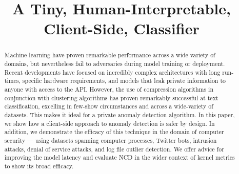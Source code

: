 \documentclass[conference]{IEEEtran}
\begin{document}
\title{A Tiny, Human-Interpretable, Client-Side, Classifier}



\maketitle

\begin{abstract}
  Machine learning have proven remarkable performance across a wide variety of domains, but nevertheless fail to adversaries during model training or deployment. 
  Recent developments have focused on incredibly complex architectures with long run-times, specific hardware requirements, and models that leak private information to anyone with access to the API.  
  However, the use of compression algorithms in conjunction with clustering algorithms has proven remarkably successful at text classification, excelling in few-show circumstances and across a wide-variety of datasets. This makes it ideal for a private anomaly detection algorithm. In this paper, we show how a client-side approach to anomaly detection is safer by design.
  In addition, we demonstrate the efficacy of this technique in the domain of computer security --- using datasets spanning computer processes, Twitter bots, intrusion attacks, denial of service attacks, and log file outlier detection.
  We offer advice for improving the model latency and evaluate NCD in the wider context of kernel metrics to show its broad efficacy.
\end{abstract}
\end{document}
